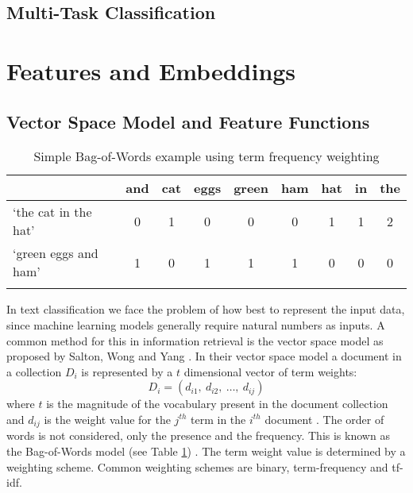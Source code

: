 \documentclass[Dissertation.tex]{subfiles}
\begin{document}
\subsection{Multi-Task Classification}\label{sec:multiTask}
\section{Features and Embeddings}
\subsection{Vector Space Model and Feature Functions}\label{sec:vecSpace}


\begin{table}[]
	\caption{Simple Bag-of-Words example using term frequency weighting}
	\label{bagOfWords}
	\centering
	\begin{tabular}{@{}lllllllll@{}}
		\toprule
		& and                    & cat                    & eggs                   & green                  & ham                    & hat                    & in                     & the                    \\ \midrule  \cline{2-9} 
		\multicolumn{1}{l|}{`the cat in the hat'} & \multicolumn{1}{c|}{0} & \multicolumn{1}{c|}{1} & \multicolumn{1}{c|}{0} & \multicolumn{1}{c|}{0} & \multicolumn{1}{c|}{0} & \multicolumn{1}{c|}{1} & \multicolumn{1}{c|}{1} & \multicolumn{1}{c|}{2} \\ \cline{2-9} 
		\multicolumn{1}{l|}{`green eggs and ham'} & \multicolumn{1}{c|}{1} & \multicolumn{1}{c|}{0} & \multicolumn{1}{c|}{1} & \multicolumn{1}{c|}{1} & \multicolumn{1}{c|}{1} & \multicolumn{1}{c|}{0} & \multicolumn{1}{c|}{0} & \multicolumn{1}{c|}{0} \\  \cline{2-9} 
		&                        &                        &                        &                        &                        &                        &                        &                        \\ \bottomrule
	\end{tabular}
	
\end{table}

In text classification we face the problem of how best to represent the input data, since machine learning models generally require natural numbers as inputs. A common method for this in information retrieval is the vector space model as proposed by Salton, Wong and Yang \cite{saltonVectorSpaceModel1975}. In their vector space model a document in a collection $ D_i $ is represented by a $ t $ dimensional vector of term weights: $$ D_i = (d_{i1},\ d_{i2},\ \dots,\ d_{ij})  $$ where $ t $ is the magnitude of the vocabulary present in the document collection and $ d_{ij} $ is the weight value for the $ j^{th} $ term in the $ i^{th} $ document \cite{saltonVectorSpaceModel1975}.
The order of words is not considered, only the presence and the frequency. This is known as the Bag-of-Words model (see Table \ref{bagOfWords}) \cite{jurafskySpeechLanguageProcessing}. The term weight value is determined by a weighting scheme. Common weighting schemes are binary, term-frequency and tf-idf.
\end{document}
